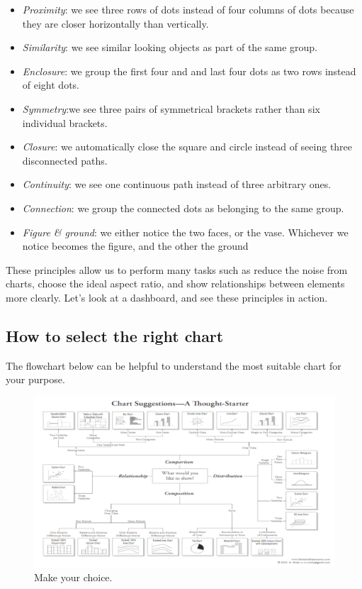 \begin{itemize}

\item \emph{Proximity}: we see three rows of dots instead of four columns of dots because they are closer horizontally than vertically.
\item \emph{Similarity}: we see similar looking objects as part of the same group.
\item \emph{Enclosure}: we group the first four and and last four dots as two rows instead of eight dots.
\item \emph{Symmetry}:we see three pairs of symmetrical brackets rather than six individual brackets.
\item \emph{Closure}: we automatically close the square and circle instead of seeing three disconnected paths.
\item \emph{Continuity}: we see one continuous path instead of three arbitrary ones.
\item \emph{Connection}: we group the connected dots as belonging to the same group.
\item \emph{Figure \& ground}: we either notice the two faces, or the vase. Whichever we notice becomes the figure, and the other the ground

\end{itemize}

These principles allow us to perform many tasks such as reduce the noise from charts, choose the ideal aspect ratio, and show relationships between elements more clearly. Let's look at a dashboard, and see these principles in action.

\subsection*{How to select the right chart}

The flowchart below can be helpful to understand the most suitable chart for your purpose.

\begin{figure}[H]%
 \centering
 \includegraphics[width=13cm]{./img/06/flow_chart}
 \caption{\label{pic:flow_chart} Make your choice.}
\end{figure}

